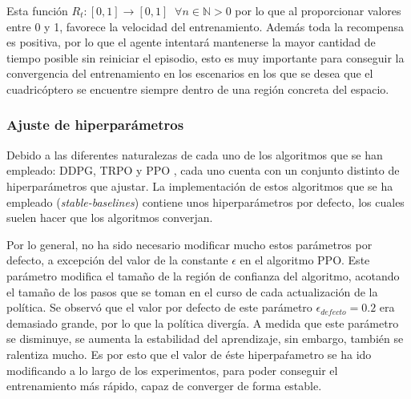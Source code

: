 Esta función $R_t:[0,1]\rightarrow [0,1] \;\; \forall n \in \mathbb{N} > 0$ por lo que al proporcionar valores entre 0 y 1, favorece la velocidad del entrenamiento. Además toda la recompensa es positiva, por lo que el agente intentará mantenerse la mayor cantidad de tiempo posible sin reiniciar el episodio, esto es muy importante para conseguir la convergencia del entrenamiento en los escenarios en los que se desea que el cuadricóptero se encuentre siempre dentro de una región concreta del espacio. 

\subsubsection{Ajuste de hiperparámetros}

Debido a las diferentes naturalezas de cada uno de los algoritmos que se han empleado: DDPG, TRPO y PPO , cada uno cuenta con un conjunto distinto de hiperparámetros que ajustar. La implementación de estos algoritmos que se ha empleado (\textit{stable-baselines}) contiene unos hiperparámetros por defecto, los cuales suelen hacer que los algoritmos converjan.

Por lo general, no ha sido necesario modificar mucho estos parámetros por defecto, a excepción del valor de la constante $\epsilon$ en el algoritmo PPO. Este parámetro modifica el tamaño de la región de confianza del algoritmo, acotando el tamaño de los pasos que se toman en el curso de cada actualización de la política. Se observó que el valor por defecto de este parámetro $\epsilon_{defecto} = 0.2$ era demasiado grande, por lo que la política divergía. A medida que este parámetro se disminuye, se aumenta la estabilidad del aprendizaje, sin embargo, también se ralentiza mucho. Es por esto que el valor de éste hiperpaŕametro se ha ido modificando a lo largo de los experimentos, para poder conseguir el entrenamiento más rápido, capaz de converger de forma estable. 



